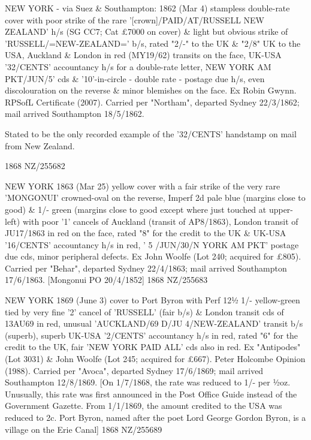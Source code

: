 \documentclass[justified]{tufte-book}
\begin{document}
%
{NEW YORK - via Suez \& Southampton: 1862 (Mar 4) stampless double-rate cover with poor strike of the rare '[crown]/PAID/AT/RUSSELL NEW ZEALAND' h/s (SG CC7; Cat £7000 on cover) \& light but obvious strike of 'RUSSELL/=NEW-ZEALAND=' b/s, rated "2/-" to the UK \& "2/8" UK to the USA, Auckland \& London in red (MY19/62) transits on the face, UK-USA '32/CENTS' accountancy h/s for a double-rate letter, NEW YORK AM PKT/JUN/5' cds \& '10'-in-circle - double rate - postage due h/s, even discolouration on the reverse \& minor blemishes on the face. Ex Robin Gwynn. RPSofL Certificate (2007). Carried per "Northam", departed Sydney 22/3/1862; mail arrived Southampton 18/5/1862. 

Stated to be the only recorded example of the '32/CENTS' handstamp on mail from New Zealand.}%
{1868}%
{NZ/255682}%
{}%
{}
{}%
{}

%
{ NEW YORK 1863 (Mar 25) yellow cover with a fair strike of the very rare 'MONGONUI' crowned-oval on the reverse, Imperf 2d pale blue (margins close to good) \& 1/- green (margins close to good except where just touched at upper-left) with poor '1' cancels of Auckland (transit of AP8/1863), London transit of JU17/1863 in red on the face, rated "8" for the credit to the UK \& UK-USA '16/CENTS' accountancy h/s in red, ' 5 /JUN/30/N YORK AM PKT' postage due cds, minor peripheral defects. Ex John Woolfe (Lot 240; acquired for £805). Carried per "Behar", departed Sydney 22/4/1863; mail arrived Southampton 17/6/1863. [Mongonui PO 20/4/1852]}%
{1868}%
{NZ/255683}%
{}%
{}
{}%
{}

%
{NEW YORK 1869 (June 3) cover to Port Byron with Perf 12½ 1/- yellow-green tied by very fine '2' cancel of 'RUSSELL' (fair b/s) \& London transit cds of 13AU69 in red, unusual 'AUCKLAND/69 D/JU 4/NEW-ZEALAND' transit b/s (superb), superb UK-USA '2/CENTS' accountancy h/s in red, rated "6" for the credit to the UK, fair 'NEW YORK PAID ALL' cds also in red. Ex "Antipodes" (Lot 3031) \& John Woolfe (Lot 245; acquired for £667). Peter Holcombe Opinion (1988). Carried per "Avoca", departed Sydney 17/6/1869; mail arrived Southampton 12/8/1869. [On 1/7/1868, the rate was reduced to 1/- per ½oz. Unusually, this rate was first announced in the Post Office Guide instead of the Government Gazette. From 1/1/1869, the amount credited to the USA was reduced to 2c. Port Byron, named after the poet Lord George Gordon Byron, is a village on the Erie Canal]}%
{1868}%
{NZ/255689}%
{}%
{}
{}%
{}
\end{document}
